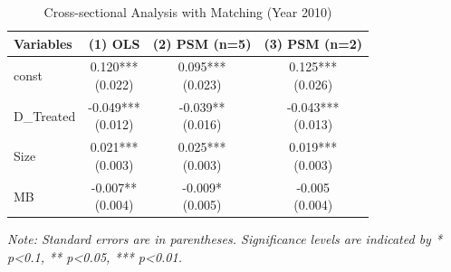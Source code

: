 \documentclass{article}
\begin{document}
\begin{table}[h!]
    \centering
    \caption{Cross-sectional Analysis with Matching (Year 2010)}
    \label{table:6}
    \begin{tabular}{lccc}
        \toprule
        Variables  & (1) OLS             & (2) PSM (n=5) & (3) PSM (n=2) \\
        \midrule
        const      & \makecell{0.120***                                  \\ (0.022)}  & \makecell{0.095*** \\ (0.023)} & \makecell{0.125*** \\ (0.026)}  \\
        D\_Treated & \makecell{-0.049***                                 \\ (0.012)} & \makecell{-0.039** \\ (0.016)} & \makecell{-0.043*** \\ (0.013)} \\
        Size       & \makecell{0.021***                                  \\ (0.003)}  & \makecell{0.025*** \\ (0.003)} & \makecell{0.019*** \\ (0.003)}  \\
        MB         & \makecell{-0.007**                                  \\ (0.004)}  & \makecell{-0.009* \\ (0.005)}  & \makecell{-0.005 \\ (0.004)}    \\
        \bottomrule
    \end{tabular}
    \newline
    \textit{Note: Standard errors are in parentheses. Significance levels are indicated by * p\textless 0.1, ** p\textless 0.05, *** p\textless 0.01.}
\end{table}
\end{document}
